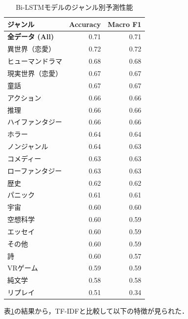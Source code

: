 \documentclass[uplatex, dvipdfmx, 11pt, a4paper, report]{jsbook}
\begin{document}
\begin{table}[H]
  \centering
  \caption{Bi-LSTMモデルのジャンル別予測性能}
  \label{tab:bilstm_result}
  \begin{tabular}{lrr} \hline
    ジャンル & Accuracy & Macro F1 \\ \hline
    \textbf{全データ (All)} & 0.71 & 0.71 \\ \hline
    異世界（恋愛） & 0.72 & 0.72 \\
    ヒューマンドラマ & 0.68 & 0.68 \\
    現実世界（恋愛） & 0.67 & 0.67 \\
    童話 & 0.67 & 0.67 \\
    アクション & 0.66 & 0.66 \\
    推理 & 0.66 & 0.66 \\
    ハイファンタジー & 0.66 & 0.66 \\
    ホラー & 0.64 & 0.64 \\
    ノンジャンル & 0.64 & 0.63 \\
    コメディー & 0.63 & 0.63 \\
    ローファンタジー & 0.63 & 0.63 \\
    歴史 & 0.62 & 0.62 \\
    パニック & 0.61 & 0.61 \\
    宇宙 & 0.60 & 0.60 \\
    空想科学 & 0.60 & 0.59 \\
    エッセイ & 0.60 & 0.59 \\
    その他 & 0.60 & 0.59 \\
    詩 & 0.60 & 0.57 \\
    VRゲーム & 0.59 & 0.59 \\
    純文学 & 0.58 & 0.58 \\
    リプレイ & 0.51 & 0.34 \\ \hline
  \end{tabular}
\end{table}

\clearpage

表\ref{tab:bilstm_result}の結果から，TF-IDFと比較して以下の特徴が見られた．
\end{document}
